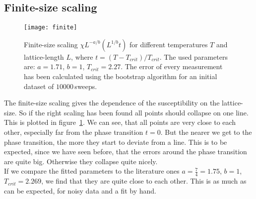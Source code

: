 \subsection{Finite-size scaling}

\begin{figure}
  \centering
  \texttt{[image: finite]}
  \caption{Finite-size scaling $\chi L^{-a/b}(L^{1/b}t)$ for different temperatures $T$ and lattice-length $L$, where $t = (T - T_{crit})/T_{crit}$. The used parameters are: $a = 1.71$, $b = 1$, $T_{crit} = 2.27$. The error of every measurement has been calculated using the bootstrap algorithm for an initial dataset of $10000\,$sweeps.}\label{fig:finite}
\end{figure}

The finite-size scaling gives the dependence of the susceptibility on the lattice-size. So if the right scaling has been found all points should collapse on one line. This is plotted in figure~\ref{fig:finite}. We can see, that all points are very close to each other, especially far from the phase transition $t = 0$. But the nearer we get to the phase transition, the more they start to deviate from a line. This is to be expected, since we have seen before, that the errors around the phase transition are quite big. Otherwise they collapse quite nicely.\\
If we compare the fitted parameters to the literature ones $a = \frac{7}{4} = 1.75$, $b = 1$, $T_{crit} = 2.269$, we find that they are quite close to each other. This is as much as can be expected, for noisy data and a fit by hand. 
